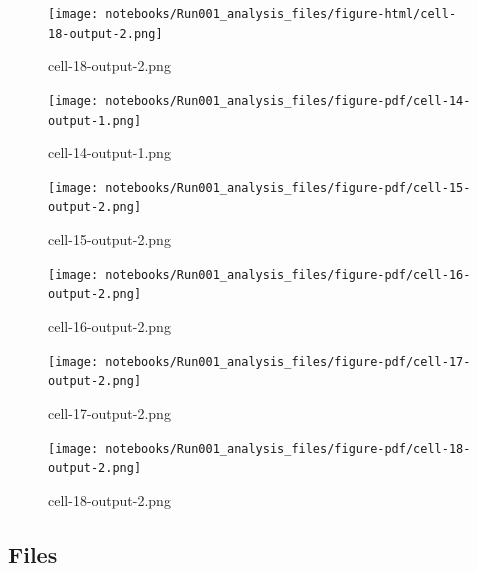 \documentclass[
  letterpaper,
  DIV=11,
  numbers=noendperiod]{scrartcl}
\begin{document}
\begin{figure}[H]

{\centering \texttt{[image: notebooks/Run001\_analysis\_files/figure-html/cell-18-output-2.png]}

}

\caption{cell-18-output-2.png}

\end{figure}%
\begin{figure}[H]

{\centering \texttt{[image: notebooks/Run001\_analysis\_files/figure-pdf/cell-14-output-1.png]}

}

\caption{cell-14-output-1.png}

\end{figure}%
\begin{figure}[H]

{\centering \texttt{[image: notebooks/Run001\_analysis\_files/figure-pdf/cell-15-output-2.png]}

}

\caption{cell-15-output-2.png}

\end{figure}%
\begin{figure}[H]

{\centering \texttt{[image: notebooks/Run001\_analysis\_files/figure-pdf/cell-16-output-2.png]}

}

\caption{cell-16-output-2.png}

\end{figure}%
\begin{figure}[H]

{\centering \texttt{[image: notebooks/Run001\_analysis\_files/figure-pdf/cell-17-output-2.png]}

}

\caption{cell-17-output-2.png}

\end{figure}%
\begin{figure}[H]

{\centering \texttt{[image: notebooks/Run001\_analysis\_files/figure-pdf/cell-18-output-2.png]}

}

\caption{cell-18-output-2.png}

\end{figure}%

\subsection{Files}\label{files}
\end{document}
